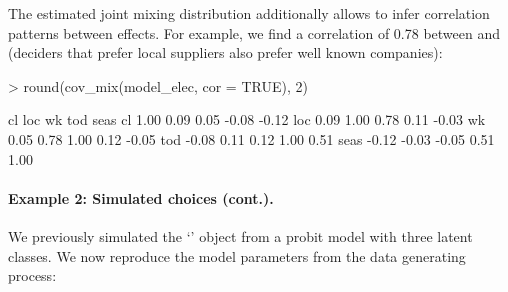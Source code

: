 \documentclass[article,shortnames]{jss}
\newcommand{\class}[1]{`\code{#1}'}
\begin{document}
The estimated joint mixing distribution additionally allows to infer correlation patterns between effects. For example, we find a correlation of 0.78 between  and  (deciders that prefer local suppliers also prefer well known companies):

\begin{Schunk}
\begin{Sinput}
> round(cov_mix(model_elec, cor = TRUE), 2)
\end{Sinput}
\begin{Soutput}
        cl   loc    wk   tod  seas
cl    1.00  0.09  0.05 -0.08 -0.12
loc   0.09  1.00  0.78  0.11 -0.03
wk    0.05  0.78  1.00  0.12 -0.05
tod  -0.08  0.11  0.12  1.00  0.51
seas -0.12 -0.03 -0.05  0.51  1.00
\end{Soutput}
\end{Schunk}

\paragraph{Example 2: Simulated choices (cont.).}

We previously simulated the \class{RprobitB\_data} object  from a probit model with three latent classes. We now reproduce the model parameters from the data generating process:
\end{document}

